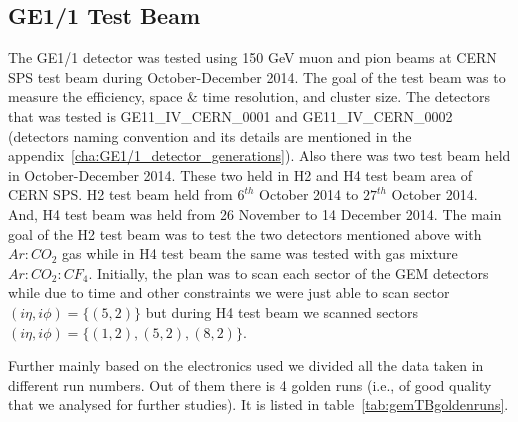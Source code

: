 
\subsection{GE1/1 Test Beam}
The GE1/1 detector was tested using 150 GeV muon and pion beams at CERN SPS test beam during October-December 2014. 
The goal of the test beam was to measure the efficiency, space \& time resolution, and cluster size. 
The detectors that was tested is GE11\_IV\_CERN\_0001 and GE11\_IV\_CERN\_0002 (detectors naming convention and its details are mentioned in the appendix~\ref{cha:GE1/1_detector_generations}).
Also there was two test beam held in October-December 2014. These two held in H2 and H4 test beam area of CERN SPS.
H2 test beam held from $6^{th}$ October 2014 to $27^{th}$ October 2014. And, H4 test beam was held from 26 November to 14 December 2014.
The main goal of the H2 test beam was to test the two detectors mentioned above with $Ar:CO_2$ gas while in H4 test beam the same was tested with gas mixture $Ar:CO_2:CF_4$.
Initially, the plan was to scan each sector of the GEM detectors while due to time and other constraints we were just able to scan sector $(i\eta, i\phi)=\{(5,2)\}$ but during H4 test beam we scanned sectors $(i\eta,i\phi)=\{(1,2),(5,2),(8,2)\}$.  

Further mainly based on the electronics used we divided all the data taken in different run numbers. Out of them there is 4 golden runs (i.e., of good quality that we analysed for further studies). It is listed in table~\ref{tab:gemTBgoldenruns}.

